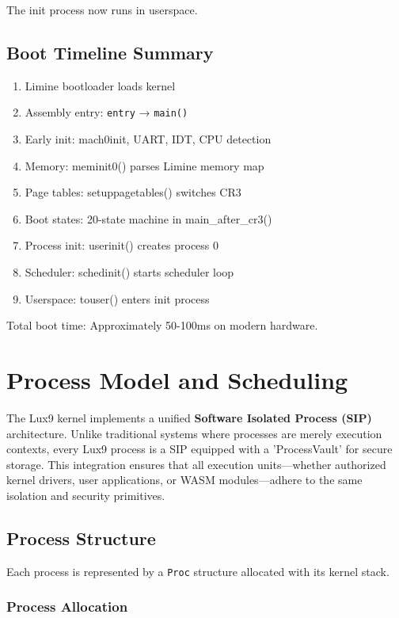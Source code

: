 \documentclass[11pt,letterpaper]{article}
\begin{document}
The init process now runs in userspace.

\subsection{Boot Timeline Summary}

\begin{enumerate}
\item Limine bootloader loads kernel
\item Assembly entry: \texttt{entry} → \texttt{main()}
\item Early init: mach0init, UART, IDT, CPU detection
\item Memory: meminit0() parses Limine memory map
\item Page tables: setuppagetables() switches CR3
\item Boot states: 20-state machine in main\_after\_cr3()
\item Process init: userinit() creates process 0
\item Scheduler: schedinit() starts scheduler loop
\item Userspace: touser() enters init process
\end{enumerate}

Total boot time: Approximately 50-100ms on modern hardware.


\section{Process Model and Scheduling}

The Lux9 kernel implements a unified \textbf{Software Isolated Process (SIP)} architecture. Unlike traditional systems where processes are merely execution contexts, every Lux9 process is a SIP equipped with a 'ProcessVault' for secure storage. This integration ensures that all execution units—whether authorized kernel drivers, user applications, or WASM modules—adhere to the same isolation and security primitives.

\subsection{Process Structure}

Each process is represented by a \texttt{Proc} structure allocated with its kernel stack.

\subsubsection{Process Allocation}
\end{document}
